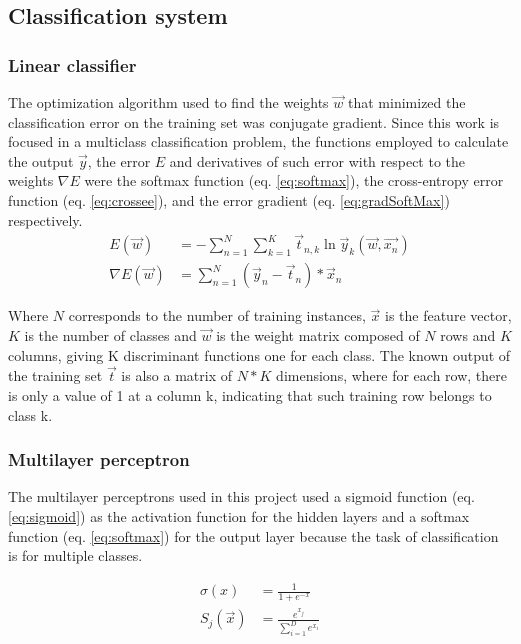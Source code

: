\documentclass{IEEEtran}
\begin{document}

\subsection{Classification system}

\subsubsection{Linear classifier}
The optimization algorithm used to find the weights $\vec{w}$ that minimized the classification error on the training 
set was conjugate gradient.
Since this work is focused in a multiclass classification problem, the functions employed to calculate the output $\vec{y}$, the error $E$
and derivatives of such error with respect to the weights $\nabla E$ were the softmax function (eq. \ref{eq:softmax}), 
the cross-entropy error function (eq. \ref{eq:crossee}), and the error gradient (eq. \ref{eq:gradSoftMax}) respectively.
\begin{align}
E(\vec{w}) &= -\sum_{n=1}^{N}{\sum_{k=1}^{K}{\vec{t}_{n,k} \ln \vec{y}_{k}(\vec{w},\vec{x_{n}})}} \label{eq:crossee} \\
\nabla E(\vec{w}) &=  \sum_{n=1}^{N}{(\vec{y}_{n} - \vec{t}_{n})*\vec{x}_{n}} \label{eq:gradSoftMax}
\end{align}

Where $N$ corresponds to the number of training instances, $\vec{x}$ is the feature vector, $K$ is the number of classes
and $\vec{w}$ is the weight matrix composed of $N$ rows and $K$ columns, giving K discriminant functions one for
each class. The known output of the training set $\vec{t}$ is also a matrix of $N * K$ dimensions, where for each row, 
there is only a value of 1 at a column k, indicating that such training row belongs to class k.

\subsubsection{Multilayer perceptron}
The multilayer perceptrons used in this project used a sigmoid function (eq. \ref{eq:sigmoid}) as the
activation function for the hidden layers and a softmax function (eq. \ref{eq:softmax}) for the output layer
because the task of classification is for multiple classes.

\begin{align}
\sigma(x) &= \frac{1}{1+e^{-x}} \label{eq:sigmoid} \\ 
S_j(\vec{x}) &= \frac{e^{x_j}}{\sum_{i=1}^D{e^{x_i}}} \label{eq:softmax}
\end{align}
\end{document}
